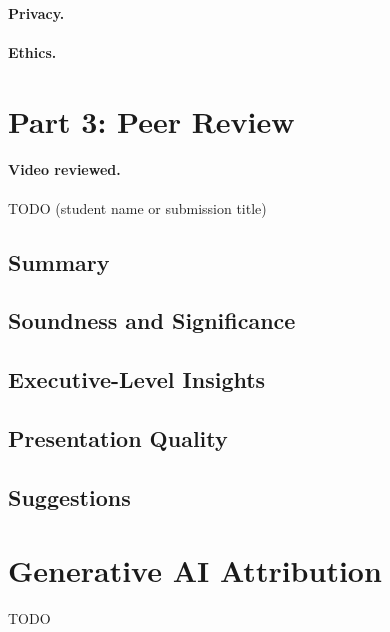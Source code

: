 \documentclass[manuscript,nonacm]{acmart} %
\begin{document}
\paragraph{Privacy.}

\paragraph{Ethics.}

\section{Part 3: Peer Review}
\label{sec:part3}

\paragraph{Video reviewed.} TODO (student name or submission title)

\subsection{Summary}

\subsection{Soundness and Significance}

\subsection{Executive-Level Insights}

\subsection{Presentation Quality}

\subsection{Suggestions}

\section*{Generative AI Attribution}
TODO
\end{document}
